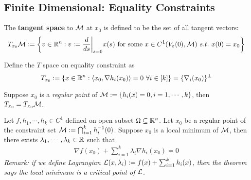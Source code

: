 \documentclass{article}
\begin{document}
\subsection{Finite Dimensional: Equality Constraints}
    \begin{definition}
        The \textbf{tangent space} to $\mathcal{{M}}$ at $x_0$ is defined to be the set of all tangent vectors:
        \begin{align}
            T_{x_0} \mathcal{{M}} := \left \{
            v \in \mathbb{R}^n
            :
            v := \frac{d}{ds} \bigg \vert_{s=0} x(s) \text{{ for some }} x \in C^1(V_\varepsilon(0), \mathcal{{M}})\ s.t.\ x(0) = x_0
            \right \}
        \end{align}
    \end{definition}

    \begin{notation}
        Define the $T$ space on equality constraint as
        \begin{align}
            T_{x_0} := \{x \in \R^n: \inner{x_0}{\nabla h_i(x_0)} = 0\ \forall i \in [k]\} = \{\nabla_i(x_0)\}^\perp
        \end{align}
    \end{notation}

    \begin{theorem}
        Suppose $x_0$ is a \emph{regular point} of $\mathcal{{M}} := \{h_i(x) = 0, i=1,\cdots,k\}$, then $T_{x_0} = T_{x_0} \mathcal{{M}}$.
    \end{theorem}

    \begin{theorem}
        Let $f, h_1, \cdots, h_k \in C^1$ defined on open subset $\Omega \subseteq \mathbb{R}^n$. Let $x_0$ be a regular point of the constraint set $\mathcal{{M}} := \bigcap_{i=1}^k h^{-1}_i(0)$. Suppose $x_0$ is a local minimum of $\mathcal{{M}}$, then there exists $\lambda_1, \cdots, \lambda_k \in \mathbb{R}$ such that
        \begin{align}
            \nabla f(x_0) + \sum_{i=1}^k \lambda_i \nabla h_i(x_0) = 0
        \end{align}
        \emph{Remark: if we define Lagrangian $\mathcal{{L}}(x, \lambda_i) := f(x) + \sum_{i=1}^k h_i(x)$, then the theorem says the local minimum is a critical point of $\mathcal{{L}}$.}
    \end{theorem}
\end{document}
